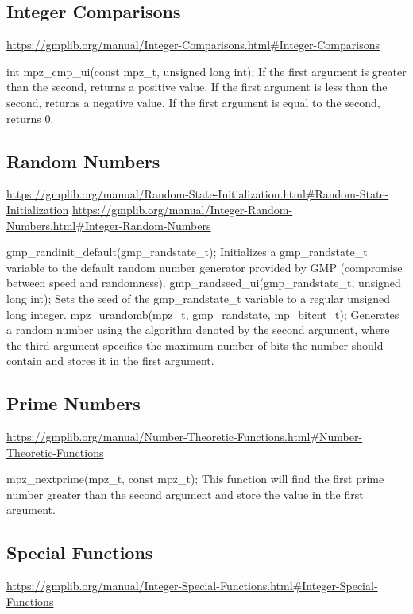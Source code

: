 \subsection{Integer Comparisons}

\url{https://gmplib.org/manual/Integer-Comparisons.html#Integer-Comparisons}

int mpz\_cmp\_ui(const mpz\_t, unsigned long int);\break
If the first argument is greater than the second, returns
a positive value. If the first argument is less than the
second, returns a negative value. If the first argument is
equal to the second, returns 0.

\subsection{Random Numbers}

\url{https://gmplib.org/manual/Random-State-Initialization.html#Random-State-Initialization}
\url{https://gmplib.org/manual/Integer-Random-Numbers.html#Integer-Random-Numbers}

gmp\_randinit\_default(gmp\_randstate\_t);\break
Initializes a gmp\_randstate\_t variable to the default
random number generator provided by GMP (compromise between
speed and randomness).
\medskip
gmp\_randseed\_ui(gmp\_randstate\_t, unsigned long int);\break
Sets the seed of the gmp\_randstate\_t variable to a regular
unsigned long integer.
\medskip
mpz\_urandomb(mpz\_t, gmp\_randstate, mp\_bitcnt\_t);\break
Generates a random number using the algorithm denoted by the
second argument, where the third argument specifies the
maximum number of bits the number should contain and stores
it in the first argument.

\subsection{Prime Numbers}

\url{https://gmplib.org/manual/Number-Theoretic-Functions.html#Number-Theoretic-Functions}

mpz\_nextprime(mpz\_t, const mpz\_t);\break
This function will find the first prime number greater than
the second argument and store the value in the first
argument.

\subsection{Special Functions}

\url{https://gmplib.org/manual/Integer-Special-Functions.html#Integer-Special-Functions}

